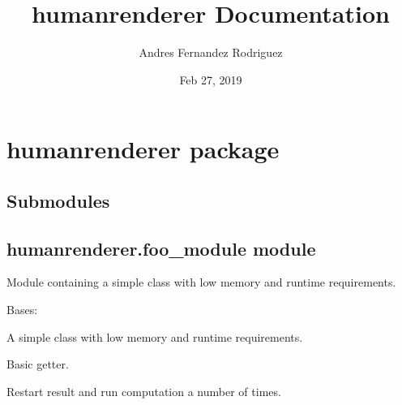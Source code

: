 \documentclass[letterpaper,10pt,english,openany,oneside]{sphinxmanual}
\title{humanrenderer Documentation}
\date{Feb 27, 2019}
\author{Andres Fernandez Rodriguez}
\begin{document}
\pagestyle{empty}
\maketitle
\pagestyle{plain}
\sphinxtableofcontents
\pagestyle{normal}
\label{\detokenize{index::doc}}



\chapter{humanrenderer package}
\label{\detokenize{humanrenderer:humanrenderer-package}}\label{\detokenize{humanrenderer::doc}}

\section{Submodules}
\label{\detokenize{humanrenderer:submodules}}

\section{humanrenderer.foo\_module module}
\label{\detokenize{humanrenderer:module-humanrenderer.foo_module}}\label{\detokenize{humanrenderer:humanrenderer-foo-module-module}}
Module containing a simple class with low memory and runtime requirements.

\begin{fulllineitems}
\label{\detokenize{humanrenderer:humanrenderer.foo_module.Foo}}
Bases: 

A simple class with low memory and runtime requirements.

\begin{fulllineitems}
\label{\detokenize{humanrenderer:humanrenderer.foo_module.Foo.get_result}}
Basic getter.

\end{fulllineitems}


\begin{fulllineitems}
\label{\detokenize{humanrenderer:humanrenderer.foo_module.Foo.loop}}
Restart result and run computation a number of times.

\end{fulllineitems}


\end{fulllineitems}
\end{document}

